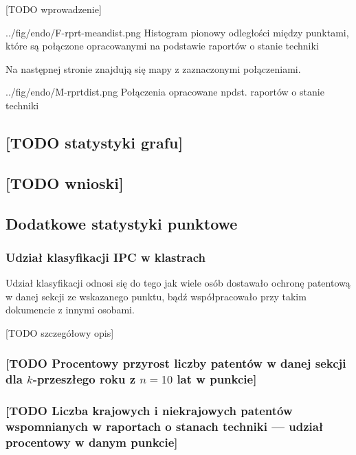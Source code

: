[TODO wprowadzenie]

  \figside
{../fig/endo/F-rprt-meandist.png}
{ Histogram pionowy odległości między punktami, które są 
  połączone opracowanymi na podstawie raportów o stanie techniki }

Na następnej stronie znajdują się mapy z zaznaczonymi połączeniami.

\newpage

{../fig/endo/M-rprtdist.png}
{ Połączenia opracowane npdst. raportów o stanie techniki }

\newpage


\subsection{[TODO statystyki grafu]}

\subsection{[TODO wnioski]}




    \newpage\subsection
  {Dodatkowe statystyki punktowe}

  \subsubsection
{Udział klasyfikacji \ac{IPC} w klastrach}\label{udział-klasyfikacji}
Udział klasyfikacji odnosi się do tego jak wiele osób dostawało 
ochronę patentową w danej sekcji ze wskazanego punktu, 
bądź współpracowało przy takim dokumencie z innymi osobami.

[TODO szczegółowy opis]

  \subsubsection
{[TODO Procentowy przyrost liczby patentów w danej sekcji 
  dla $k$-przeszłego roku z $n=10$ lat w punkcie]}\label{przyrost-patentów}

  \subsubsection
{[TODO Liczba krajowych i niekrajowych patentów wspomnianych
  w raportach o stanach techniki --- udział procentowy w danym punkcie]}\label{rprt-krajowy}

